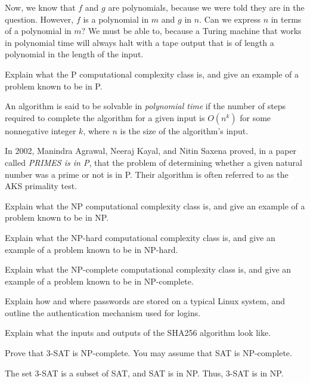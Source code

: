 \documentclass[a4paper, 12pt]{exam}
\begin{document}
\begin{questions}
\begin{solution}
    Now, we know that $f$ and $g$ are polynomials, because we were told they are in the question.
    However, $f$ is a polynomial in $m$ and $g$ in $n$.
    Can we express $n$ in terms of a polynomial in $m$?
    We must be able to, because a Turing machine that works in polynomial time will always halt with a tape output that is of length a polynomial in the length of the input. 
  \end{solution}

\question
  Explain what the P computational complexity class is, and give an example of a problem known to be in P.
  \begin{solution}
    An algorithm is said to be solvable in \emph{polynomial time} if the number of steps required to complete the algorithm for a given input is $O(n^k)$ for some nonnegative integer $k$, where $n$ is the size of the algorithm's input.

    In 2002, Manindra Agrawal, Neeraj Kayal, and Nitin Saxena proved, in a paper called \emph{PRIMES is in P}, that the problem of determining whether a given natural number was a prime or not is in P.
    Their algorithm is often referred to as the AKS primality test.
  \end{solution}


\question
  Explain what the NP computational complexity class is, and give an example of a problem known to be in NP.

\question
  Explain what the NP-hard computational complexity class is, and give an example of a problem known to be in NP-hard.

\question
  Explain what the NP-complete computational complexity class is, and give an example of a problem known to be in NP-complete.


\question
  Explain how and where passwords are stored on a typical Linux system, and outline the authentication mechanism used for logins.

\question
  Explain what the inputs and outputs of the SHA256 algorithm look like.


  \question
  Prove that 3-SAT is NP-complete. You may assume that SAT is NP-complete.
  \begin{solution}
    The set 3-SAT is a subset of SAT, and SAT is in NP.
    Thus, 3-SAT is in NP.


\end{solution}
\end{questions}
\end{document}
